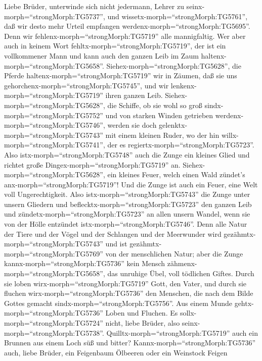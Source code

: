  Liebe Brüder, unterwinde sich nicht jedermann, Lehrer zu
seinx-morph=``strongMorph:TG5737'', und
wissetx-morph=``strongMorph:TG5761'', daß wir desto mehr Urteil
empfangen werdenx-morph=``strongMorph:TG5695''.  Denn wir
fehlenx-morph=``strongMorph:TG5719'' alle mannigfaltig. Wer aber auch in
keinem Wort fehltx-morph=``strongMorph:TG5719'', der ist ein
vollkommener Mann und kann auch den ganzen Leib im Zaum
haltenx-morph=``strongMorph:TG5658''. 
Siehex-morph=``strongMorph:TG5628'', die Pferde
haltenx-morph=``strongMorph:TG5719'' wir in Zäumen, daß sie uns
gehorchenx-morph=``strongMorph:TG5745'', und wir
lenkenx-morph=``strongMorph:TG5719'' ihren ganzen Leib. 
Siehex-morph=``strongMorph:TG5628'', die Schiffe, ob sie wohl so groß
sindx-morph=``strongMorph:TG5752'' und von starken Winden getrieben
werdenx-morph=``strongMorph:TG5746'', werden sie doch
gelenktx-morph=``strongMorph:TG5743'' mit einem kleinen Ruder, wo der
hin willx-morph=``strongMorph:TG5741'', der es
regiertx-morph=``strongMorph:TG5723''.  Also
istx-morph=``strongMorph:TG5748'' auch die Zunge ein kleines Glied und
richtet große Dingex-morph=``strongMorph:TG5719'' an.
Siehex-morph=``strongMorph:TG5628'', ein kleines Feuer, welch einen Wald
zündet's anx-morph=``strongMorph:TG5719''!  Und die Zunge
ist auch ein Feuer, eine Welt voll Ungerechtigkeit. Also
istx-morph=``strongMorph:TG5743'' die Zunge unter unsern Gliedern und
beflecktx-morph=``strongMorph:TG5723'' den ganzen Leib und
zündetx-morph=``strongMorph:TG5723'' an allen unsern Wandel, wenn sie
von der Hölle entzündet istx-morph=``strongMorph:TG5746''. 
Denn alle Natur der Tiere und der Vögel und der Schlangen und der
Meerwunder wird gezähmtx-morph=``strongMorph:TG5743'' und ist
gezähmtx-morph=``strongMorph:TG5769'' von der menschlichen Natur;
 aber die Zunge kannx-morph=``strongMorph:TG5736'' kein
Mensch zähmenx-morph=``strongMorph:TG5658'', das unruhige Übel, voll
tödlichen Giftes.  Durch sie loben
wirx-morph=``strongMorph:TG5719'' Gott, den Vater, und durch sie fluchen
wirx-morph=``strongMorph:TG5736'' den Menschen, die nach dem Bilde
Gottes gemacht sindx-morph=``strongMorph:TG5756''.  Aus
einem Munde gehtx-morph=``strongMorph:TG5736'' Loben und Fluchen. Es
sollx-morph=``strongMorph:TG5724'' nicht, liebe Brüder, also
seinx-morph=``strongMorph:TG5738''. 
Quilltx-morph=``strongMorph:TG5719'' auch ein Brunnen aus einem Loch süß
und bitter?  Kannx-morph=``strongMorph:TG5736'' auch, liebe
Brüder, ein Feigenbaum Ölbeeren oder ein Weinstock Feigen
